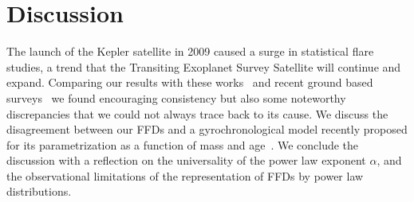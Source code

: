\documentclass{aa}
\begin{document}
\section{Discussion}
\label{sec:discussion}
The launch of the Kepler satellite in 2009 caused a surge in statistical flare studies, a trend that the Transiting Exoplanet Survey Satellite will continue and expand. Comparing our results with these works~\citep{shibayama2013,lurie2015,lin2019,raetz2020} and recent ground based surveys~\citep{chang2015,howard2019} we found encouraging consistency but also some noteworthy discrepancies that we could not always trace back to its cause. We discuss the disagreement between our FFDs and a gyrochronological model recently proposed for its parametrization as a function of mass and age~\citep{davenport2019}. We conclude the discussion with a reflection on the universality of the power law exponent $\alpha$, and the observational limitations of the representation of FFDs by power law distributions.
\end{document}
